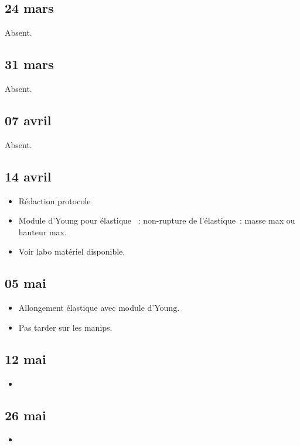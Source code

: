 \documentclass[a4paper, 11pt, final, garamond]{book}
\begin{document}
\subsection{24 mars}
\begin{center}
    Absent.
\end{center}

\subsection{31 mars}
\begin{center}
  Absent.
\end{center}

\subsection{07 avril}
\begin{center}
    Absent.
\end{center}

\subsection{14 avril}
\begin{itemize}
  \item Rédaction protocole
  \item Module d'Young pour élastique
  ~: non-rupture de l'élastique~: masse max ou hauteur max.
  \item Voir labo matériel disponible.
\end{itemize}

\subsection{05 mai}
\begin{itemize}
  \item Allongement élastique avec module d'Young.
  \item Pas tarder sur les manips.
\end{itemize}

\subsection{12 mai}
\begin{itemize}
  \item 
\end{itemize}

\subsection{26 mai}
\begin{itemize}
  \item 
\end{itemize}
\end{document}
